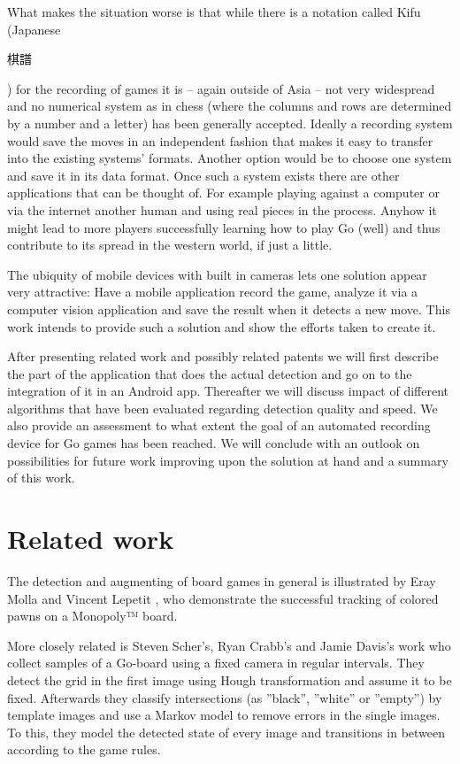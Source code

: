 	What makes the situation worse is that while there is a notation called Kifu (Japanese \begingroup\setmainfont{Droid Sans Japanese}\small\begin{CJK}{UTF8}{min}棋譜\end{CJK}\endgroup ) for the recording of games it is -- again outside of Asia -- not very widespread and no numerical system as in chess (where the columns and rows are determined by a number and a letter) has been generally accepted. Ideally a recording system would save the moves in an independent fashion that makes it easy to transfer into the existing systems' formats. Another option would be to choose one system and save it in its data format. Once such a system exists there are other applications that can be thought of. For example playing against a computer or via the internet another human and using real pieces in the process. Anyhow it might lead to more players successfully learning how to play Go (well) and thus contribute to its spread in the western world, if just a little. %

	The ubiquity of mobile devices with built in cameras lets one solution appear very attractive: Have a mobile application record the game, analyze it via a computer vision application and save the result when it detects a new move. This	work intends to provide such a solution and show the efforts taken to create it.

	After presenting related work and possibly related patents we will first describe the part of the application that does the actual detection and go on to the integration of it in an Android app. Thereafter we will discuss impact of different algorithms that have been evaluated regarding detection quality and speed. We also provide an assessment to what extent the goal of an automated recording device for Go games has been reached. We will conclude with an outlook on possibilities for future work improving upon the solution at hand and a summary of this work.


	\section{Related work}
	\label{introduction-work}
	The detection and augmenting of board games in general is illustrated by Eray Molla and Vincent Lepetit \cite{molla2010augmented}, who demonstrate the successful tracking of colored pawns on a Monopoly™ board.

	More closely related is  Steven Scher's, Ryan Crabb's and Jamie Davis's work \cite{scher2008making} who collect samples of a Go-board using a fixed camera in regular intervals. They detect the grid in the first image using Hough transformation and assume it to be fixed. Afterwards they classify intersections (as ''black'', ''white'' or ''empty'') by template images and use a Markov model to remove errors in the single images. To this, they model the detected state of every image and transitions in between according to the game rules.

